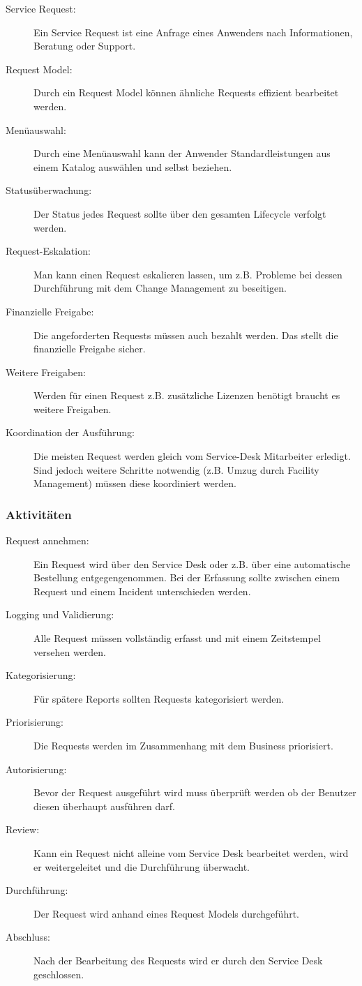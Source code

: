 \begin{description}
	\item[Service Request:] Ein Service Request ist eine Anfrage eines Anwenders nach Informationen, Beratung oder Support.
	\item[Request Model:] Durch ein Request Model können ähnliche Requests effizient bearbeitet werden.
	\item[Menüauswahl:] Durch eine Menüauswahl kann der Anwender Standardleistungen aus einem Katalog auswählen und selbst beziehen.
	\item[Statusüberwachung:] Der Status jedes Request sollte über den gesamten Lifecycle verfolgt werden.
	\item[Request-Eskalation:] Man kann einen Request eskalieren lassen, um z.B. Probleme bei dessen Durchführung mit dem Change Management zu beseitigen.
	\item[Finanzielle Freigabe:] Die angeforderten Requests müssen auch bezahlt werden. Das stellt die finanzielle Freigabe sicher.
	\item[Weitere Freigaben:] Werden für einen Request z.B. zusätzliche Lizenzen benötigt braucht es weitere Freigaben.
	\item[Koordination der Ausführung:] Die meisten Request werden gleich vom Service-Desk Mitarbeiter erledigt. Sind jedoch weitere Schritte notwendig (z.B. Umzug durch Facility Management) müssen diese koordiniert werden.
\end{description}

\subsubsection{Aktivitäten}

\begin{description}
	\item[Request annehmen:] Ein Request wird über den Service Desk oder z.B. über eine automatische Bestellung entgegengenommen. Bei der Erfassung sollte zwischen einem Request und einem Incident unterschieden werden.
	\item[Logging und Validierung:] Alle Request müssen vollständig erfasst und mit einem Zeitstempel versehen werden.
	\item[Kategorisierung:] Für spätere Reports sollten Requests kategorisiert werden.
	\item[Priorisierung:] Die Requests werden im Zusammenhang mit dem Business priorisiert.
	\item[Autorisierung:] Bevor der Request ausgeführt wird muss überprüft werden ob der Benutzer diesen überhaupt ausführen darf.
	\item[Review:] Kann ein Request nicht alleine vom Service Desk bearbeitet werden, wird er weitergeleitet und die Durchführung überwacht.
	\item[Durchführung:] Der Request wird anhand eines Request Models durchgeführt.
	\item[Abschluss:] Nach der Bearbeitung des Requests wird er durch den Service Desk geschlossen.
\end{description}

